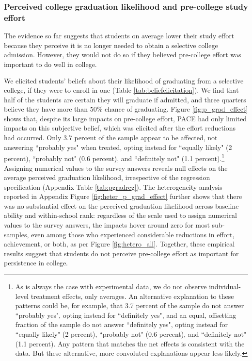\subsubsection{Perceived college graduation likelihood and pre-college study effort}\label{sec:pgrad}

The evidence so far suggests that students on average lower their study effort because they perceive it is no longer needed to obtain a selective college admission. However, they would not do so if they believed pre-college effort was important to do well in college.\par 


We elicited students' beliefs about their likelihood of graduating from a selective college, if they were to enroll in one (Table \ref{tab:beliefelicitation}). We find that half of the students are certain they will graduate if admitted, and three quarters believe they have more than $50\%$ chance of graduating. Figure \ref{fig:p_grad_effect} shows that, despite its large impacts on pre-college effort, PACE had only limited impacts on this subjective belief, which was elicited after the effort reductions had occurred. Only 3.7 percent of the sample appear to be affected, not answering ``probably yes" when treated, opting instead for ``equally likely" (2 percent), ``probably not" (0.6 percent), and ``definitely not" (1.1 percent).\footnote{As is always the case with experimental data, we do not observe individual-level treatment effects, only averages. An alternative explanation to these patterns could be, for example, that 3.7 percent of the sample do not answer ``probably yes", opting instead for ``definitely yes", and an equal, offsetting fraction of the sample do not answer ``definitely yes", opting instead for ``equally likely" (2 percent), ``probably not" (0.6 percent), and ``definitely not" (1.1 percent). Any pattern that matches the net effects is consistent with the data. But these alternative, more convoluted explanations appear less likely.} Assigning numerical values to the survey answers reveals null effects on the average perceived graduation likelihood, irrespective of the regression specification (Appendix Table \ref{tab:pgradreg}). The heterogeneity analysis reported in Appendix Figure \ref{fig:heter_p_grad_effect} further shows that there was no substantial effect on the perceived graduation likelihood across baseline ability and within-school rank: regardless of the scale used to assign numerical values to the survey answers, the impacts hover around zero for most sub-samples, even among those who experienced considerable reductions in effort, achievement, or both, as per Figure \ref{fig:hetero_all}. Together, these empirical results suggest that students do not perceive pre-college effort as important for persistence in college.



